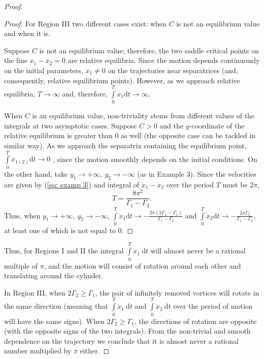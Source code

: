 \documentclass[11pt,twoside]{article}
\theoremstyle{definition}
\numberwithin{equation}{section}
\begin{document}
\begin{proof}
\begin{proof}
           
       For Region III two different cases exist: when $C$ is not an equilibrium value and when it is. 
       
       
       Suppose $C$ is not an equilibrium value; therefore, the two saddle critical points on the line $x_1-x_2=0$ are relative equilibria. Since the motion depends continuously on the initial parameters, $\dot{x}_1\ne 0$ on the trajectories near separatrices (and, consequently, relative equilibrium points). However, as we approach relative equilibria, $T\to\infty$ and, therefore, $\int\limits_0^T\dot{x_1}\mathrm{d}t\to \infty$. 
       
       
       When $C$ is an equilibrium value, non-triviality stems from different values of the integrals at two asymptotic cases. Suppose $C>0$ and the $y$-coordinate of the relative equilibrium is greater than 0 as well (the opposite case can be tackled in similar way). As we approach the separatrix containing the equilibrium point, $\int\limits_0^T\dot{x}_{1(2)}\mathrm{d}t\to0$ , since the motion smoothly depends on the initial conditions. On the other hand, take $y_1\to +\infty,  \ y_2\to-\infty $ (as in Example 3). Since the velocities are given by (\ref{eq: examp 3}) and integral of $\dot{x}_1-\dot{x}_2$ over the period $T$ must be $2\pi$, 
       \[
       T = \frac{8\pi^2}{\Gamma_1 - \Gamma_2}.
       \]
       Thus, when $y_1\to +\infty,  \ y_2\to-\infty $,  $\int\limits_0^T\dot{x}_{1}\mathrm{d}t\to -\frac{2\pi\left(2\Gamma_2 - \Gamma_1\right)}{\Gamma_1 - \Gamma_2}$ and $\int\limits_0^T\dot{x}_{2}\mathrm{d}t\to -\frac{2\pi\Gamma_2}{\Gamma_1 - \Gamma_2}$, at least one of which is not equal to 0. 
        \end{proof}
        
        
        Thus, for Regions I and II the integral  $\int\limits_0^T \dot{x}_1 \ \mathrm{d}t $ will almost never be a rational  multiple of  $\pi$, and the motion will consist of rotation around each other and translating around the cylinder. 
        
        
        In Region III, when $2\Gamma_2\ge \Gamma_1$, the pair of infinitely removed vortices will rotate in the same direction (meaning that $\int\limits_0^T \dot{x}_1 \ \mathrm{d} t$ and $\int\limits_0^T \dot{x}_2 \ \mathrm{d} t$ over the period of motion will have the same signs). When $2\Gamma_2\ge \Gamma_1$, the directions of rotation are opposite (with the opposite signs of the two integrals). From the non-trivial and smooth dependence on the trajectory we conclude that it is almost never a rational number multiplied by $\pi$ either. 
        

\end{proof}
\end{document}
